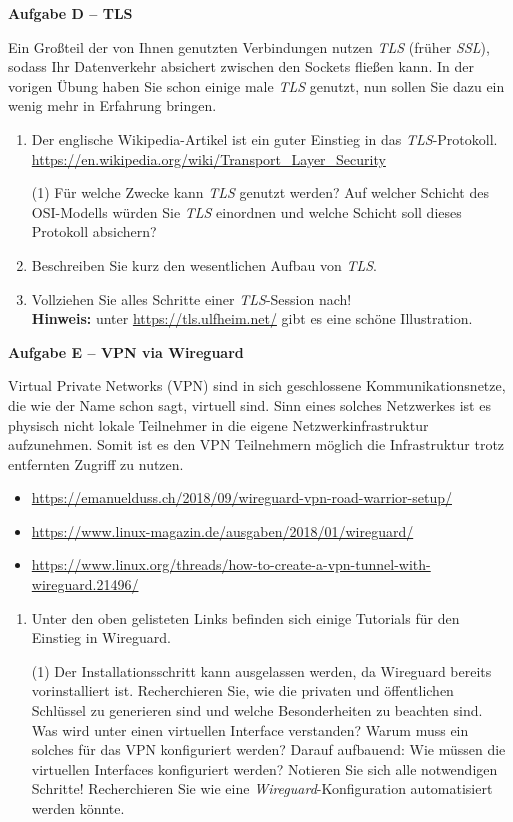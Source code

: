 \documentclass[paper=a4,fontsize=11pt]{scrartcl}%
\begin{document}
\begin{center}\Large{\textbf{Aufgabe D -- TLS}}\end{center}\vskip0.25in
Ein Großteil der von Ihnen genutzten Verbindungen nutzen \emph{TLS} (früher \emph{SSL}), sodass Ihr Datenverkehr absichert zwischen den Sockets fließen kann. In der vorigen Übung haben Sie schon einige male \emph{TLS} genutzt, nun sollen Sie dazu ein wenig mehr in Erfahrung bringen.
\begin{enumerate}
	\item Der englische Wikipedia-Artikel ist ein guter Einstieg in das \emph{TLS}-Protokoll.\\
	\url{https://en.wikipedia.org/wiki/Transport_Layer_Security}
	\begin{tasks}(1)
		\task Für welche Zwecke kann \emph{TLS} genutzt werden?
		\task Auf welcher Schicht des OSI-Modells würden Sie \emph{TLS} einordnen und welche Schicht soll dieses Protokoll absichern?
	\end{tasks}
	\item Beschreiben Sie kurz den wesentlichen Aufbau von \emph{TLS}.
	\item Vollziehen Sie alles Schritte einer \emph{TLS}-Session nach!\\
	\textbf{Hinweis:} unter \url{https://tls.ulfheim.net/} gibt es eine schöne Illustration.
\end{enumerate}

\begin{center}\Large{\textbf{Aufgabe E -- VPN via Wireguard}}\end{center}\vskip0.25in
Virtual Private Networks (VPN) sind in sich geschlossene Kommunikationsnetze, die wie der Name schon sagt, virtuell sind. Sinn eines solches Netzwerkes ist es physisch nicht lokale Teilnehmer in die eigene Netzwerkinfrastruktur aufzunehmen. Somit ist es den VPN Teilnehmern möglich die Infrastruktur trotz entfernten Zugriff zu nutzen.
\begin{itemize}
	\item \url{https://emanuelduss.ch/2018/09/wireguard-vpn-road-warrior-setup/}
	\item \url{https://www.linux-magazin.de/ausgaben/2018/01/wireguard/}
	\item \url{https://www.linux.org/threads/how-to-create-a-vpn-tunnel-with-wireguard.21496/}
\end{itemize}
\begin{enumerate}
	\item Unter den oben gelisteten Links befinden sich einige Tutorials für den Einstieg in Wireguard.
	\begin{tasks}(1)
		\task Der Installationsschritt kann ausgelassen werden, da Wireguard bereits vorinstalliert ist.
		\task Recherchieren Sie, wie die privaten und öffentlichen Schlüssel zu generieren sind und welche Besonderheiten zu beachten sind.
		\task Was wird unter einen virtuellen Interface verstanden? Warum muss ein solches für das VPN konfiguriert werden?
		\task Darauf aufbauend: Wie müssen die virtuellen Interfaces konfiguriert werden? Notieren Sie sich alle notwendigen Schritte!
		\task Recherchieren Sie wie eine \emph{Wireguard}-Konfiguration automatisiert werden könnte.
	\end{tasks}
\end{enumerate}	
\end{document}
